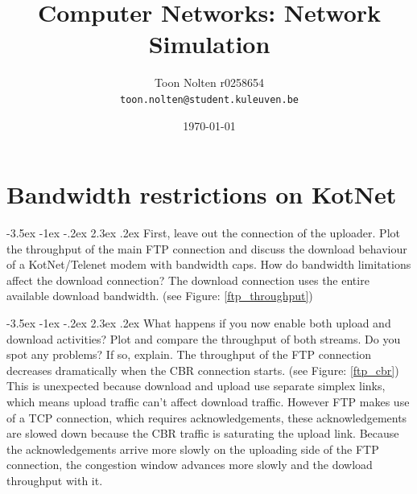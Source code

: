 \documentclass[9pt, a4paper, oneside]{article}
\makeatletter
\renewcommand\subsection{\@startsection{subsection}{2}{\z@}
    {-3.5ex \@plus -1ex \@minus -.2ex}
    {2.3ex \@plus.2ex}
    {\normalfont\normalsize\bfseries}}
\makeatother
\begin{document}
\title{Computer Networks: Network Simulation}
\author{Toon Nolten r0258654\\
    \texttt{toon.nolten@student.kuleuven.be}
        }
\date{\today}
\maketitle

\newpage

\section{Bandwidth restrictions on KotNet}

\subsection{First, leave out the connection of the uploader.
    Plot the throughput of the main FTP connection and discuss the download
    behaviour of a KotNet/Telenet modem with bandwidth caps.
    How do bandwidth limitations affect the download connection?}
The download connection uses the entire available download bandwidth.
(see Figure: \ref{ftp_throughput})

\subsection{What happens if you now enable both upload and download activities?
    Plot and compare the throughput of both streams.
    Do you spot any problems?
    If so, explain.}
The throughput of the FTP connection decreases dramatically when the CBR
connection starts. (see Figure: \ref{ftp_cbr})
This is unexpected because download and upload use separate simplex links,
which means upload traffic can't affect download traffic.
However FTP makes use of a TCP connection, which requires acknowledgements,
these acknowledgements are slowed down because the CBR traffic is
saturating the upload link.
Because the acknowledgements arrive more slowly on the uploading side of the
FTP connection, the congestion window advances more slowly and the dowload
throughput with it.
\end{document}
